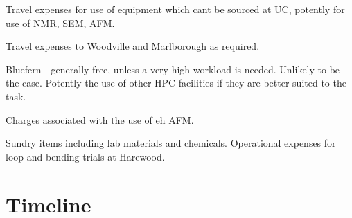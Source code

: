 \documentclass{article}
\begin{document}
Travel expenses for use of equipment which cant be sourced at UC,
potently for use of NMR, SEM, AFM.

Travel expenses to Woodville and Marlborough as required.

Bluefern - generally free, unless a very high workload is needed. Unlikely to be
the case. Potently the use of other HPC facilities if they are better suited to
the task.

Charges associated with the use of eh AFM.

Sundry items including lab materials and chemicals. Operational
expenses for loop and bending trials at Harewood.

\section{Timeline}
\onehalfspacing
\end{document}
